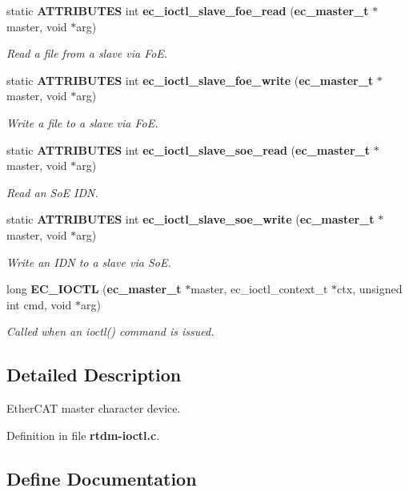\begin{DoxyCompactItemize}
static {\bf \-A\-T\-T\-R\-I\-B\-U\-T\-E\-S} int {\bf ec\-\_\-ioctl\-\_\-slave\-\_\-foe\-\_\-read} ({\bf ec\-\_\-master\-\_\-t} $\ast$master, void $\ast$arg)
\begin{DoxyCompactList}\small\item\em \-Read a file from a slave via \-Fo\-E. \end{DoxyCompactList}\item 
static {\bf \-A\-T\-T\-R\-I\-B\-U\-T\-E\-S} int {\bf ec\-\_\-ioctl\-\_\-slave\-\_\-foe\-\_\-write} ({\bf ec\-\_\-master\-\_\-t} $\ast$master, void $\ast$arg)
\begin{DoxyCompactList}\small\item\em \-Write a file to a slave via \-Fo\-E. \end{DoxyCompactList}\item 
static {\bf \-A\-T\-T\-R\-I\-B\-U\-T\-E\-S} int {\bf ec\-\_\-ioctl\-\_\-slave\-\_\-soe\-\_\-read} ({\bf ec\-\_\-master\-\_\-t} $\ast$master, void $\ast$arg)
\begin{DoxyCompactList}\small\item\em \-Read an \-So\-E \-I\-D\-N. \end{DoxyCompactList}\item 
static {\bf \-A\-T\-T\-R\-I\-B\-U\-T\-E\-S} int {\bf ec\-\_\-ioctl\-\_\-slave\-\_\-soe\-\_\-write} ({\bf ec\-\_\-master\-\_\-t} $\ast$master, void $\ast$arg)
\begin{DoxyCompactList}\small\item\em \-Write an \-I\-D\-N to a slave via \-So\-E. \end{DoxyCompactList}\item 
long {\bf \-E\-C\-\_\-\-I\-O\-C\-T\-L} ({\bf ec\-\_\-master\-\_\-t} $\ast$master, ec\-\_\-ioctl\-\_\-context\-\_\-t $\ast$ctx, unsigned int cmd, void $\ast$arg)
\begin{DoxyCompactList}\small\item\em \-Called when an ioctl() command is issued. \end{DoxyCompactList}\end{DoxyCompactItemize}


\subsection{\-Detailed \-Description}
\-Ether\-C\-A\-T master character device. 

\-Definition in file {\bf rtdm-\/ioctl.\-c}.



\subsection{\-Define \-Documentation}
